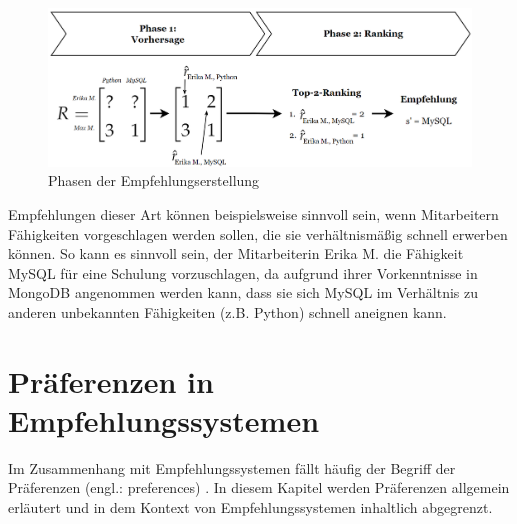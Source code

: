 \begin{figure}[H]
    \centering
	\includegraphics[width=1.0\textwidth]{gfx/phasen-empfehlungserstellung.png}
	\caption[Phasen der Empfehlungserstellung]{Phasen der Empfehlungserstellung\\}
	\label{fig:empfehlungssysteme:recommendation:abb1}
\end{figure}

Empfehlungen dieser Art können beispielsweise sinnvoll sein, wenn Mitarbeitern Fähigkeiten vorgeschlagen werden sollen, die sie verhältnismäßig schnell erwerben können.
So kann es sinnvoll sein, der Mitarbeiterin Erika M. die Fähigkeit MySQL für eine Schulung vorzuschlagen, da aufgrund ihrer Vorkenntnisse in MongoDB angenommen werden kann, dass sie sich MySQL im Verhältnis zu anderen unbekannten Fähigkeiten (z.B. Python) schnell aneignen kann.

\section{Präferenzen in Empfehlungssystemen}
\label{ch:empfehlungssysteme:preferences}
Im Zusammenhang mit Empfehlungssystemen fällt häufig der Begriff der Präferenzen (engl.: preferences) \cite[S. 2]{ricci:inbook}\cite[S. 11f.]{recommenderSystems:2016}\cite[S. 87]{ekstrand:article}\cite[S. 2429]{palomares:inproceedings}.
In diesem Kapitel werden Präferenzen allgemein erläutert und in dem Kontext von Empfehlungssystemen inhaltlich abgegrenzt.

